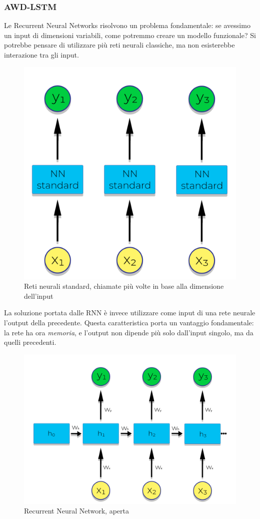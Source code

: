 \subsubsection{AWD-LSTM}
Le Recurrent Neural Networks risolvono un problema fondamentale: se avessimo un input di dimensioni variabili, come potremmo creare un modello funzionale? Si potrebbe pensare di utilizzare più reti neurali classiche, ma non esisterebbe interazione tra gli input.
\begin{figure}[H]
    \begin{center}
        \includegraphics[width=0.5\columnwidth]{images/fallback/multiply-called-NN.png}
    \end{center}
    \caption{Reti neurali standard, chiamate più volte in base alla dimensione dell'input}
    \label{fig:multiply-called-NN}
\end{figure}
La soluzione portata dalle RNN è invece utilizzare come input di una rete neurale l'output della precedente. Questa caratteristica porta un vantaggio fondamentale: la rete ha ora \textit{memoria}, e l'output non dipende più solo dall'input singolo, ma da quelli precedenti.
\begin{figure}[H]
    \begin{center}
        \includegraphics[width=0.5\columnwidth]{images/fallback/unfolded-RNN.png}
    \end{center}
    \caption{Recurrent Neural Network, aperta}
    \label{fig:unfolded-RNN}
\end{figure}
